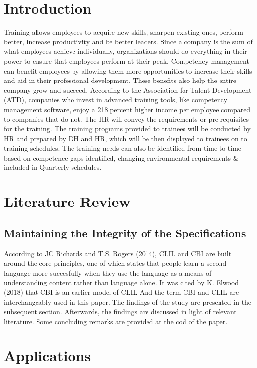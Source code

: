 \documentclass[conference]{IEEEtran}
\begin{document}
\section{Introduction}
      
Training allows employees to acquire new skills, sharpen existing ones, perform better, 
increase productivity and be better leaders. Since a company is the sum of what employees 
achieve individually, organizations should do everything in their power to ensure that 
employees perform at their peak.
Competency management can benefit employees by allowing them more opportunities 
to increase their skills and aid in their professional development. These benefits also help the 
entire company grow and succeed. According to the Association for Talent Development 
(ATD), companies who invest in advanced training tools, like competency management 
software, enjoy a 218 percent higher income per employee compared to companies that do not.
The HR will convey the requirements or pre-requisites for the training. The training 
programs provided to trainees will be conducted by HR and prepared by DH and HR, which 
will be then displayed to trainees on to training schedules. The training needs can also be 
identified from time to time based on competence gaps identified, changing environmental 
requirements \& included in Quarterly schedules.

\section{Literature Review}

\subsection{Maintaining the Integrity of the Specifications}

According to JC Richards and T.S. Rogers (2014), CLIL and CBI are built around the core principles, one of which states that people learn a second language more succesfully when they use the language as a means of understanding content rather than language alone. It was cited by K. Elwood (2018) that CBI is an earlier model of CLIL And the term CBI and CLIL are interchangeably used in this paper. The findings of the study are presented in the subsequent section. Afterwards, the findings are discussed in light of relevant literature. Some concluding remarks are provided at the cod of the paper.

\section{Applications}
\end{document}
